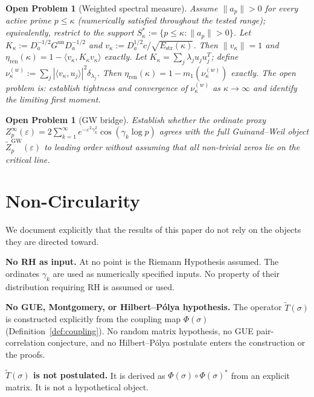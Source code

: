 \documentclass[11pt]{article}
\newtheorem{openproblem}[theorem]{Open Problem}
\newcommand{\Estr}{E_{\mathrm{str}}}
\newcommand{\etaren}{\eta_{\mathrm{ren}}}
\newcommand{\Tt}{\widetilde{T}}
\begin{document}
\begin{openproblem}[Weighted spectral measure]\label{op:measure}
Assume $\|a_p\|>0$ for every active prime $p\leq\kappa$
(numerically satisfied throughout the tested range);
equivalently, restrict to the support
$S_\kappa^*:=\{p\leq\kappa:\|a_p\|>0\}$.
Let $K_\kappa:=D_a^{-1/2}G^{\mathrm{un}}D_a^{-1/2}$ and
$v_\kappa:=D_a^{1/2}c/\sqrt{\Estr(\kappa)}$.
Then $\|v_\kappa\|=1$ and
$\etaren(\kappa)=1-\langle v_\kappa,K_\kappa v_\kappa\rangle$ exactly.
Let $K_\kappa=\sum_j\lambda_j u_j u_j^T$; define
$\nu_\kappa^{(w)}:=\sum_j|\langle v_\kappa,u_j\rangle|^2\delta_{\lambda_j}$.
Then $\etaren(\kappa)=1-m_1(\nu_\kappa^{(w)})$ exactly.
The open problem is: establish tightness and convergence
of $\nu_\kappa^{(w)}$ as $\kappa\to\infty$ and identify
the limiting first moment.
\end{openproblem}

\begin{openproblem}[GW bridge]\label{op:gwbridge}
Establish whether the ordinate proxy
$Z_p^\infty(\varepsilon)=2\sum_{k=1}^\infty e^{-\varepsilon^2\gamma_k^2}\cos(\gamma_k\log p)$
agrees with the full Guinand--Weil object
$\widetilde Z_p^{\mathrm{GW}}(\varepsilon)$ to leading order
without assuming that all non-trivial zeros
lie on the critical line.
\end{openproblem}

\section*{Non-Circularity}
\label{sec:nocirc}

We document explicitly that the results of this paper do not rely
on the objects they are directed toward.

\textbf{No RH as input.}
At no point is the Riemann Hypothesis assumed.
The ordinates $\gamma_k$ are used as numerically specified inputs.
No property of their distribution requiring RH is assumed or used.

\textbf{No GUE, Montgomery, or Hilbert--P\'olya hypothesis.}
The operator $\Tt(\sigma)$ is constructed explicitly from the coupling
map $\Phi(\sigma)$ (Definition~\ref{def:coupling}).
No random matrix hypothesis, no GUE pair-correlation conjecture,
and no Hilbert--P\'olya postulate enters the construction or the proofs.

\textbf{$\Tt(\sigma)$ is not postulated.}
It is derived as $\Phi(\sigma)\circ\Phi(\sigma)^*$ from an explicit matrix.
It is not a hypothetical object.
\end{document}
